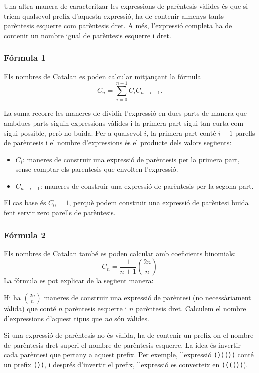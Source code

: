 Una altra manera de caracteritzar les expressions de parèntesis
vàlides és que si triem qualsevol prefix d'aquesta expressió, ha de
contenir almenys tants parèntesis esquerre com parèntesis dret. A més,
l'expressió completa ha de contenir un nombre igual de parèntesis
esquerre i dret.

\subsubsection{Fórmula 1}

Els nombres de Catalan es poden calcular mitjançant la fórmula
\[ C_n = \sum_{i=0}^{n-1} C_{i} C_{n-i-1}.\]


La suma recorre les maneres de dividir l'expressió en dues parts de
manera que ambdues parts siguin expressions vàlides i la primera part
sigui tan curta com sigui possible, però no buida. Per a qualsevol
$i$, la primera part conté $i+1$ parells de parèntesis i el nombre
d'expressions és el producte dels valors següents:


\begin{itemize}
\item $C_{i}$: maneres de construir una expressió de parèntesis
  per la primera part, sense comptar els parentesis que envolten l'expressió.
\item $C_{n-i-1}$: maneres de construir una expressió de parèntesis
  per la segona part.
\end{itemize}

El cas base és $C_0=1$, perquè podem construir una expressió de
parèntesi buida fent servir zero parells de parèntesis.

\subsubsection{Fórmula 2}

Els nombres de Catalan també es poden calcular amb coeficients binomials:
\[ C_n = \frac{1}{n+1} {2n \choose n}\]
La fórmula es pot explicar de la següent manera:

Hi ha ${2n \choose n}$ maneres de construir una expressió de parèntesi
(no necessàriament vàlida) que conté $n$ parèntesis esquerre i $n$
parèntesis dret. Calculem el nombre d'expressions d'aquest tipus que
\emph{no} són vàlides.

Si una expressió de parèntesis no és vàlida, ha de contenir un prefix
on el nombre de parèntesis dret superi el nombre de parèntesis
esquerre. La idea és invertir cada parèntesi que pertany a aquest
prefix. Per exemple, l'expressió \texttt{())()(} conté un prefix
\texttt{())}, i després d'invertir el prefix, l'expressió es
converteix en \texttt{)((()(}).

